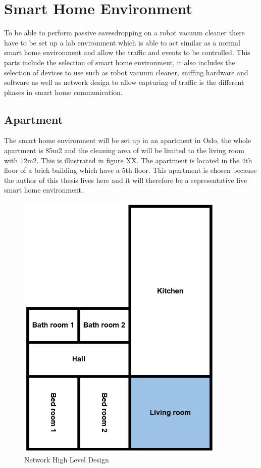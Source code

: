 \section{Smart Home Environment}
To be able to perform passive eavesdropping on a robot vacuum cleaner there have to be set up a lab environment which is able to act similar as a normal smart home environment and allow the traffic and events to be controlled. This parts include the selection of smart home environment, it also includes the selection of devices to use such as robot vacuum cleaner, sniffing hardware and software as well as network design to allow capturing of traffic is the different phases in smart home communication. 

\subsection{Apartment}
The smart home environment will be set up in an apartment in Oslo, the whole apartment is 85m2 and the cleaning area of will be limited to the living room with 12m2. This is illustrated in figure XX. The apartment is located in the 4th floor of a brick building which have a 5th floor. This apartment is chosen because the author of this thesis lives here and it will therefore be a representative live smart home environment.

\begin{figure}[!ht]
    \centering
    \includegraphics[width=10cm]{figures/Apartment.png}
    \caption{Network High Level Design}
    \label{fig:HLD}
\end{figure}

